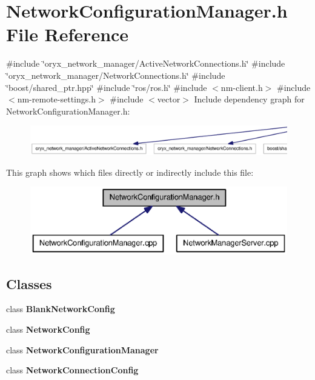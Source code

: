 \section{\-Network\-Configuration\-Manager.\-h \-File \-Reference}
\label{NetworkConfigurationManager_8h}
{\ttfamily \#include \char`\"{}oryx\-\_\-network\-\_\-manager/\-Active\-Network\-Connections.\-h\char`\"{}}\*
{\ttfamily \#include \char`\"{}oryx\-\_\-network\-\_\-manager/\-Network\-Connections.\-h\char`\"{}}\*
{\ttfamily \#include \char`\"{}boost/shared\-\_\-ptr.\-hpp\char`\"{}}\*
{\ttfamily \#include \char`\"{}ros/ros.\-h\char`\"{}}\*
{\ttfamily \#include $<$nm-\/client.\-h$>$}\*
{\ttfamily \#include $<$nm-\/remote-\/settings.\-h$>$}\*
{\ttfamily \#include $<$vector$>$}\*
\-Include dependency graph for \-Network\-Configuration\-Manager.\-h\-:
\nopagebreak
\begin{figure}[H]
\begin{center}
\leavevmode
\includegraphics[width=350pt]{NetworkConfigurationManager_8h__incl}
\end{center}
\end{figure}
\-This graph shows which files directly or indirectly include this file\-:
\nopagebreak
\begin{figure}[H]
\begin{center}
\leavevmode
\includegraphics[width=350pt]{NetworkConfigurationManager_8h__dep__incl}
\end{center}
\end{figure}
\subsection*{\-Classes}
\begin{DoxyCompactItemize}
\item 
class {\bf \-Blank\-Network\-Config}
\item 
class {\bf \-Network\-Config}
\item 
class {\bf \-Network\-Configuration\-Manager}
\item 
class {\bf \-Network\-Connection\-Config}
\end{DoxyCompactItemize}
